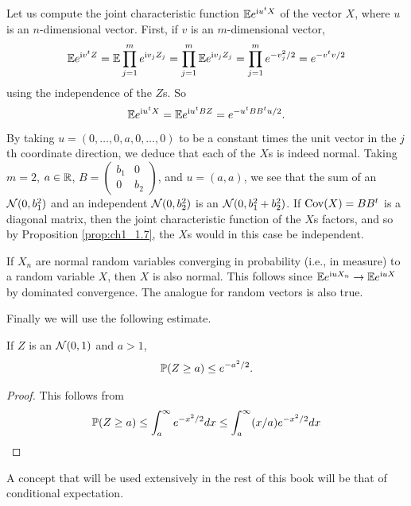 Let us compute the joint characteristic function $\E e^{\im u^t X}$ of the vector $X$, where $u$ is an $n$-dimensional vector. First, if $v$ is an $m$-dimensional vector,
\[
    \E e^{\im v^t Z} = \E \prod_{j=1}^m e^{\im v_jZ_j} = \prod_{j=1}^m \E e^{\im v_jZ_j} = \prod_{j=1}^m e^{-v_j^2/2} = e^{-v^t v/2}
\]
using the independence of the $Z$s. So
\begin{equation}\label{eq:ch1_1.6}
    \E e^{\im u^t X} = \E e^{\im u^t BZ} = e^{-u^t BB^tu/2}.
\end{equation}
By taking $u = (0,\ldots,0,a,0,\ldots,0)$ to be a constant times the unit vector in the $j$th coordinate direction, we deduce that each of the $X$s is indeed normal. Taking $m = 2$, $a \in \R$, $B = \begin{pmatrix}b_1 & 0\\ 0 & b_2\end{pmatrix}$, and $u = (a,a)$, we see that the sum of an $\NC(0,b_1^2)$ and an independent $\NC(0,b_2^2)$ is an $\NC(0,b_1^2 + b_2^2)$. If $\Cov(X) = BB^t$ is a diagonal matrix, then the joint characteristic function of the $X$s factors, and so by Proposition \ref{prop:ch1_1.7}, the $X$s would in this case be independent.

If $X_n$ are normal random variables converging in probability (i.e., in measure) to a random variable $X$, then $X$ is also normal. This follows since $\E e^{\im uX_n} \to \E e^{\im uX}$ by dominated convergence. The analogue for random vectors is also true.

Finally we will use the following estimate.

\begin{proposition}\label{prop:ch1_1.9}
If $Z$ is an $\NC(0,1)$ and $a > 1$,
\mpagebreak
\begin{equation}\label{eq:ch1_1.7}
    \P(Z \geq a) \leq e^{-a^2/2}.
\end{equation}
\end{proposition}

\begin{proof}
This follows from
\[
    \P(Z \geq a) \leq \int_a^\infty e^{-x^2/2}dx \leq \int_a^\infty (x/a)e^{-x^2/2}dx
\]
\end{proof}


A concept that will be used extensively in the rest of this book will be that of conditional expectation.

